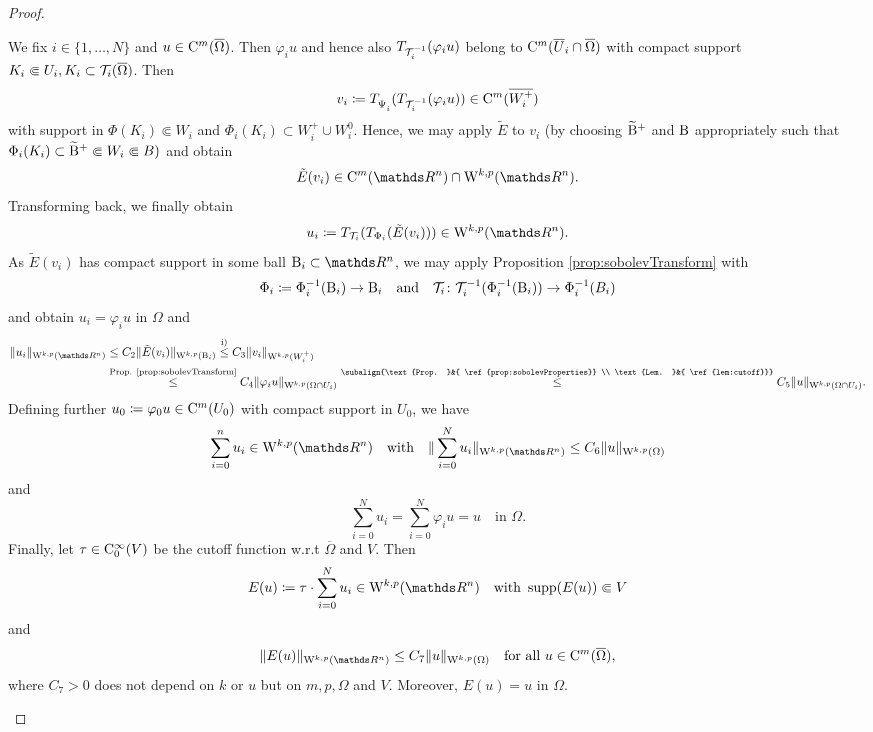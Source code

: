 \begin{proof}
\begin{enumerate}[i)]
      We fix $i \in \{1,\dots,N\}$ and $u \in \mathrm{C}^m(\overline\Omega)$.
      Then $\varphi_i u$ and hence also $T_{\mathcal{T}_i^{-1}}(\varphi_i u)$ belong to $\mathrm{C}^m(\overline U_i \cap \overline\Omega)$ with compact support $K_i \Subset U_i, K_i \subset \mathcal{T}_i(\overline\Omega)$.
      Then
      $$
      v_i \coloneqq T_{\vphantom{\Tau_i^{-1}}{\Psi_i^{\vphantom{-1}}}}(T_{\Tau_i^{-1}}(\varphi_i u)) \in \CC^m(\overline{W_i^+})
      $$
      with support in $\Phi(K_i) \Subset W_i$ and $\Phi_i(K_i) \subset W_i^+ \cup W_i^0$.
      Hence, we may apply $\tilde E$ to $v_i$ (by choosing $\widetilde {\mathrm{B}}^+$ and $\mathrm{B}$ appropriately such that $\Phi_i(K_i) \subset \widetilde {\mathrm{B}}^+ \Subset W_i \Subset B)$ and obtain
      $$
      \tilde E(v_i)  \in \CC^m(\R^n) \cap \WW^{k,p}(\R^n).
      $$
      Transforming back, we finally obtain
      $$
      u_i \coloneqq T_{\Tau_i} ( T_{\Phi_i}( \tilde E(v_i))) \in \WW^{k,p}(\R^n).
      $$
      As $\tilde E(v_i)$ has compact support in some ball $\BB_i \subset \R^n$, we may apply Proposition \ref{prop:sobolevTransform} with 
      $$
      \Phi_i \coloneqq \Phi_i^{-1}(\mathrm{B}_i) \to \mathrm{B}_i \quad\text{and}\quad
      \mathcal{T}_i \colon \mathcal{T}_i^{-1}(\Phi_i^{-1}(\mathrm{B}_i)) \to \Phi_i^{-1}(B_i)
      $$
      and obtain $u_i = \varphi_i u$ in $\Omega$ and 
      \begin{align*}
        \|u_i\|_{\WW^{k,p}(\R^n)}
        &\leq C_2 \| \tilde E(v_i) \|_{\WW^{k,p}(\BB_i)}
        \overset{\mathrm i)}{\leq} C_3 \| v_i \|_{\WW^{k,p}(W_i^+)} \\
        &\overset{\text{Prop. \ref{prop:sobolevTransform}}}{\leq} C_4 \|\varphi_i u\|_{\WW^{k,p}(\Omega \cap U_i)}  
        \overset{\subalign{\text{Prop. }&{ \ref{prop:sobolevProperties}} \\ \text{Lem. }&{ \ref{lem:cutoff}}}}{\leq} C_5 \|u\|_{\WW^{k,p}(\Omega \cap U_i)}.
      \end{align*}
      Defining further $u_0 \coloneqq \varphi_0 u \in \mathrm{C}^m(U_0)$ with compact support in $U_0$, we have 
      $$
        \sum_{i = 0}^n u_i \in \WW^{k,p}(\R^n) \quad\text{with}\quad \| \sum_{i = 0}^N u_i \|_{\WW^{k,p}(\R^n)} \leq C_6 \|u\|_{\WW^{k,p}(\Omega)} 
        $$
        and
        $$
        \sum_{i = 0}^N u_i = \sum_{i = 0}^N \varphi_i u = u \quad\text{in }\Omega.
        $$
        Finally, let $\tau \in \mathrm{C}_0^\infty(V)$ be the cutoff function w.r.t $\overline \Omega$ and $V$. Then
        $$
        E(u) \coloneqq \tau \cdot \sum_{i = 0}^N u_i \in \WW^{k,p}(\R^n) \quad\text{with } \supp (E(u)) \Subset V
        $$
        and
        \begin{equation}
          \label{eq:continuousExtension}
          \|E(u)\|_{\WW^{k,p}(\R^n)} \leq C_7 \|u \|_{\WW^{k,p}(\Omega)} \quad\text{for all } u \in \CC^m(\overline\Omega),
        \end{equation}
        where $C_7 > 0$ does not depend on $k$ or $u$ but on $m,p,\Omega$ and $V$.
        Moreover, $E(u) = u$ in $\Omega$.


\end{enumerate}
\end{proof}
